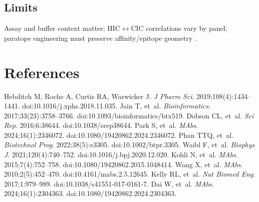\subsection*{Limits}
Assay and buffer context matter; HIC$\leftrightarrow$CIC correlations vary by panel; paratope engineering must preserve affinity/epitope geometry \cite{Jain2017,Waibl2021}.

\section*{References}
\begin{small}
\begin{thebibliography}{99}
 Hebditch M, Roche A, Curtis RA, Warwicker J. \emph{J Pharm Sci}. 2019;108(4):1434–1441. doi:10.1016/j.xphs.2018.11.035.
 Jain T, et~al. \emph{Bioinformatics}. 2017;33(23):3758–3766. doi:10.1093/bioinformatics/btx519.
 Dobson CL, et~al. \emph{Sci Rep}. 2016;6:38644. doi:10.1038/srep38644.
 Park S, et~al. \emph{MAbs}. 2024;16(1):2346072. doi:10.1080/19420862.2024.2346072.
 Phan TTQ, et~al. \emph{Biotechnol Prog}. 2022;38(5):e3305. doi:10.1002/btpr.3305.
 Waibl F, et~al. \emph{Biophys J}. 2021;120(4):740–752. doi:10.1016/j.bpj.2020.12.020.
 Kohli N, et~al. \emph{MAbs}. 2015;7(4):752–758. doi:10.1080/19420862.2015.1048414.
 Wang X, et~al. \emph{MAbs}. 2010;2(5):452–470. doi:10.4161/mabs.2.5.12645.
 Kelly RL, et~al. \emph{Nat Biomed Eng}. 2017;1:979–989. doi:10.1038/s41551-017-0161-7.
 Dai W, et~al. \emph{MAbs}. 2024;16(1):2304363. doi:10.1080/19420862.2024.2304363.
\end{thebibliography}
\end{small}
